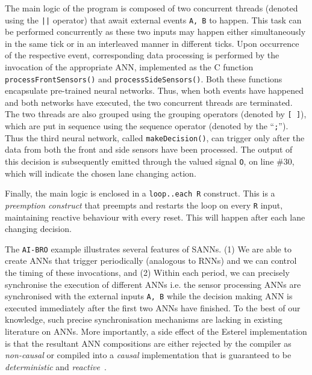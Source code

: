 The main logic of the program is composed of two concurrent threads (denoted using the \texttt{||} operator)
that await external events \texttt{A, B} to happen. 
This task can be performed concurrently as these two inputs may happen either simultaneously in the same tick or 
in an interleaved manner in different ticks. Upon occurrence of the respective event, corresponding data processing 
is performed by the invocation of the appropriate \ac{ANN}, implemented as the C function \texttt{processFrontSensors()}
and \texttt{processSideSensors()}. Both these functions encapsulate pre-trained neural networks. Thus, when both events have 
happened and both networks have executed, the two concurrent threads are terminated. The two threads are also grouped using the 
grouping operators (denoted by \texttt{[ ]}), which are put in sequence using the sequence operator (denoted by the ``\texttt;''). %
Thus the third neural network, called \texttt{makeDecision()},
can trigger only after the data from both the front and side sensors have been processed. 
The output of this decision is subsequently emitted through the valued signal \texttt{O}, on line \#30, which will indicate the chosen lane changing action.

Finally, the main logic is enclosed in a \texttt{loop..each R} construct. This is a \emph{preemption construct} that preempts and restarts the 
loop on every \texttt{R} input, maintaining reactive behaviour with every reset.
This will happen after each lane changing decision.


The \texttt{AI-BRO} example illustrates several features of \acp{SANN}. (1) We are able to create \acp{ANN} that trigger periodically (analogous
to \acp{RNN}) and we can control the timing of these invocations, and (2) Within each period, we can precisely synchronise the 
execution of different \acp{ANN} i.e. the sensor processing \acp{ANN} are synchronised with the external inputs 
\texttt{A, B} while the decision making \ac{ANN} is executed immediately after the first two \acp{ANN} have finished. 
To the best of our knowledge, such precise synchronisation mechanisms are lacking in existing literature on \acp{ANN}.
More importantly, a side effect of the Esterel implementation is that the resultant \ac{ANN} compositions are 
either rejected by the compiler as \emph{non-causal} or compiled into a \emph{causal} implementation that is guaranteed to be
\emph{deterministic} and \emph{reactive}~\cite{benveniste2003synchronous}.

